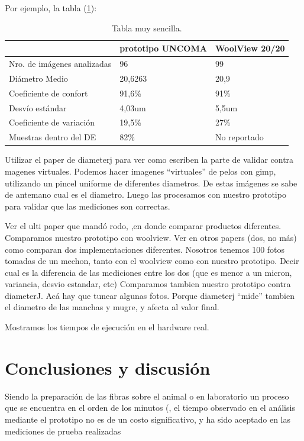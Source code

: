 \documentclass[runningheads,a4paper]{llncs}
\begin{document}
Por ejemplo, la tabla (\ref{tabla:sencilla}):

\begin{table}[htbp]
\begin{center}
\begin{tabular}{|l|l|l|}
\hline
& prototipo UNCOMA & WoolView 20/20 \\
\hline \hline \hline
Nro. de imágenes analizadas & 96 & 99 \\ \hline
Diámetro Medio & 20,6263 & 20,9 \\ \hline
Coeficiente de confort & 91,6\% & 91\% \\ \hline
Desvío estándar & 4,03um & 5,5um \\ \hline
Coeficiente de variación & 19,5\% & 27\% \\ \hline
Muestras dentro del DE & 82\% & No reportado \\ \hline
\end{tabular}
\caption{Tabla muy sencilla.}
\label{tabla:sencilla}
\end{center}
\end{table}


Utilizar el paper de diameterj para ver como escriben la parte de validar contra magenes virtuales. Podemos hacer imagenes “virtuales” de pelos con gimp, utilizando un pincel uniforme de diferentes diametros. De estas imágenes se sabe de antemano cual es el diametro. Luego las procesamos con nuestro prototipo para validar que las mediciones son correctas.


Ver el ulti paper que mandó rodo, ,en donde comparar productos diferentes. Comparamos nuestro prototipo con woolview. Ver en otros papers (dos, no más) como comparan dos implementaciones diferentes.
Nosotros tenemos 100 fotos tomadas de un mechon, tanto con el woolview como con nuestro prototipo. Decir cual es la diferencia de las mediciones entre los dos (que es menor a un micron, variancia, desvio estandar, etc)
Comparamos tambien nuestro prototipo contra diameterJ. Acá hay que tunear algunas fotos. Porque diameterj “mide” tambien el diametro de las manchas y mugre, y afecta al valor final.

Mostramos los tiempos de ejecución en el hardware real.

\section{Conclusiones y discusión}
Siendo la preparación de las fibras sobre el animal o en laboratorio un proceso que se encuentra en el orden de los minutos (, el tiempo observado en el análisis mediante el prototipo no es de un costo significativo, y ha sido aceptado  en las mediciones de prueba realizadas 
\end{document}
